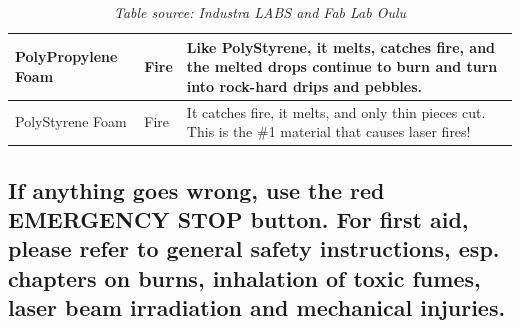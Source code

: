 \documentclass[fleqn]{article}
\begin{document}
\begin{table}[h]
\begin{tabularx}{\textwidth}{|m{10em}|l|X|}
		PolyPropylene Foam & Fire  & Like PolyStyrene, it melts, catches fire, and the melted drops continue to burn and turn into rock-hard drips and pebbles.                                                                                                                                                  \\ \hline
		PolyStyrene Foam & Fire & It catches fire, it melts, and only thin pieces cut. This is the \#1 material that causes laser fires!   
		\\\hline                                                                                                                                                      
	\end{tabularx}
	\caption{\textit{Table source: Industra LABS and Fab Lab Oulu}}
\end{table}

\vfill


\begingroup
\color{industra-manual-darkred}
\subsection{If anything goes wrong, use the red \textbf{EMERGENCY STOP} button. For first aid, please refer to general safety instructions, esp. chapters on
	burns, inhalation of toxic fumes, laser beam irradiation and mechanical injuries.}
\endgroup
\begingroup




\clearpage
\generateservicelist

\clearpage
\generateservicelist
\end{document}
